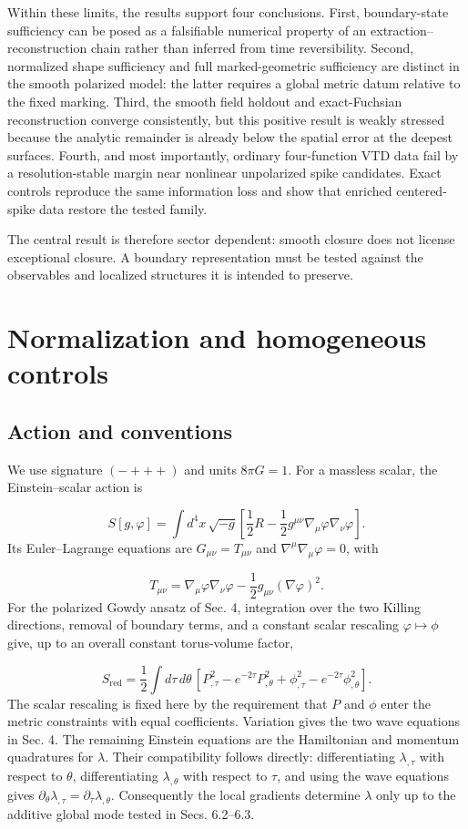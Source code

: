 \documentclass{iopjournal}
\begin{document}
Within these limits, the results support four conclusions. First, boundary-state sufficiency can be posed as a falsifiable numerical property of an extraction--reconstruction chain rather than inferred from time reversibility. Second, normalized shape sufficiency and full marked-geometric sufficiency are distinct in the smooth polarized model: the latter requires a global metric datum relative to the fixed marking. Third, the smooth field holdout and exact-Fuchsian reconstruction converge consistently, but this positive result is weakly stressed because the analytic remainder is already below the spatial error at the deepest surfaces. Fourth, and most importantly, ordinary four-function VTD data fail by a resolution-stable margin near nonlinear unpolarized spike candidates. Exact controls reproduce the same information loss and show that enriched centered-spike data restore the tested family.

The central result is therefore sector dependent: smooth closure does not license exceptional closure. A boundary representation must be tested against the observables and localized structures it is intended to preserve.

\appendix
\section{Normalization and homogeneous controls}
\subsection{Action and conventions}
We use signature $(-+++)$ and units $8\pi G=1$. For a massless scalar, the Einstein--scalar action is

\[
S[g,\varphi]=\int d^4x\,\sqrt{-g}\left[
\frac12 R-\frac12 g^{\mu\nu}\nabla_\mu\varphi\nabla_\nu\varphi
\right].
\]
Its Euler--Lagrange equations are $G_{\mu\nu}=T_{\mu\nu}$ and $\nabla^\mu\nabla_\mu\varphi=0$, with

\[
T_{\mu\nu}=\nabla_\mu\varphi\nabla_\nu\varphi
-\frac12g_{\mu\nu}(\nabla\varphi)^2.
\]
For the polarized Gowdy ansatz of Sec. 4, integration over the two Killing directions, removal of boundary terms, and a constant scalar rescaling $\varphi\mapsto\phi$ give, up to an overall constant torus-volume factor,

\[
S_{\mathrm{red}}=\frac12\int d\tau\,d\theta\,
\left[P_{,\tau}^2-e^{-2\tau}P_{,\theta}^2
+\phi_{,\tau}^2-e^{-2\tau}\phi_{,\theta}^2\right].
\]
The scalar rescaling is fixed here by the requirement that $P$ and $\phi$ enter the metric constraints with equal coefficients. Variation gives the two wave equations in Sec. 4. The remaining Einstein equations are the Hamiltonian and momentum quadratures for $\lambda$. Their compatibility follows directly: differentiating $\lambda_{,\tau}$ with respect to $\theta$, differentiating $\lambda_{,\theta}$ with respect to $\tau$, and using the wave equations gives $\partial_\theta\lambda_{,\tau}=\partial_\tau\lambda_{,\theta}$. Consequently the local gradients determine $\lambda$ only up to the additive global mode tested in Secs. 6.2--6.3.
\end{document}
